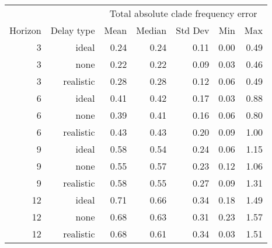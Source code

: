 
\begin{tabular*}{0.7\textwidth}{rrrrrrr}
\toprule
        &            & \multicolumn{5}{c}{Total absolute clade frequency error} \\
Horizon & Delay type & Mean & Median & Std Dev & Min & Max \\
\midrule

3 & ideal & 0.24 & 0.24 & 0.11 & 0.00 & 0.49 \\
3 & none & 0.22 & 0.22 & 0.09 & 0.03 & 0.46 \\
3 & realistic & 0.28 & 0.28 & 0.12 & 0.06 & 0.49 \\
6 & ideal & 0.41 & 0.42 & 0.17 & 0.03 & 0.88 \\
6 & none & 0.39 & 0.41 & 0.16 & 0.06 & 0.80 \\
6 & realistic & 0.43 & 0.43 & 0.20 & 0.09 & 1.00 \\
9 & ideal & 0.58 & 0.54 & 0.24 & 0.06 & 1.15 \\
9 & none & 0.55 & 0.57 & 0.23 & 0.12 & 1.06 \\
9 & realistic & 0.58 & 0.55 & 0.27 & 0.09 & 1.31 \\
12 & ideal & 0.71 & 0.66 & 0.34 & 0.18 & 1.49 \\
12 & none & 0.68 & 0.63 & 0.31 & 0.23 & 1.57 \\
12 & realistic & 0.68 & 0.61 & 0.34 & 0.03 & 1.51 \\

\bottomrule
\end{tabular*}

